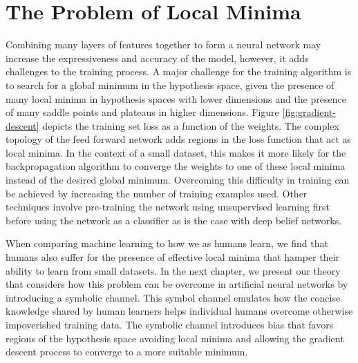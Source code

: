 \section{The Problem of Local Minima} \label{sec:background-problem-local-minima}

Combining many layers of features together to form a neural network may increase the expressiveness and accuracy of the model, however, it adds challenges to the training process. A major challenge for the training algorithm is to search for a global minimum in the hypothesis space, given the presence of many local minima in hypothesis spaces with lower dimensions\cite{Larochelle:2009:EST:1577069.1577070} and the presence of many saddle points and plateaus in higher dimensions\cite{DBLP:journals/corr/DauphinPGCGB14}. Figure \ref{fig:gradient-descent} depicts the training set loss as a function of the weights. The complex topology of the feed forward network adds regions in the loss function that act as local minima. In the context of a small dataset, this makes it more likely for the backpropagation algorithm to converge the weights to one of these local minima instead of the desired global minimum\cite{Larochelle:2009:EST:1577069.1577070}. Overcoming this difficulty in training can be achieved by increasing the number of training examples used. Other techniques involve pre-training the network using unsupervised learning first before using the network as a classifier as is the case with deep belief networks\cite{Larochelle:2009:EST:1577069.1577070}.

When comparing machine learning to how we as humans learn, we find that humans also suffer for the presence of effective local minima that hamper their ability to learn from small datasets\cite{Larochelle:2009:EST:1577069.1577070}. In the next chapter, we present our theory that considers how this problem can be overcome in artificial neural networks by introducing a symbolic channel. This symbol channel emulates how the concise knowledge shared by human learners helps individual humans overcome otherwise impoverished training data. The symbolic channel introduces bias that favors regions of the hypothesis space avoiding local minima and allowing the gradient descent process to converge to a more suitable minimum.